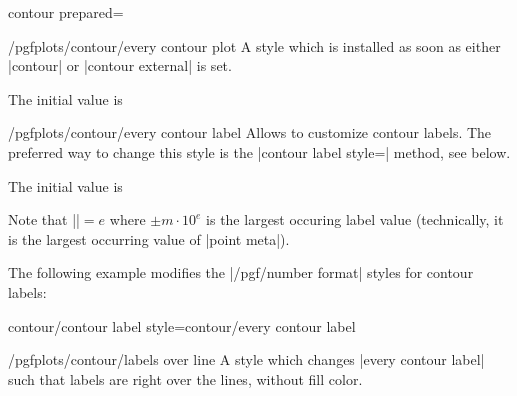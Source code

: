 {{\begin{plottype}[/pgfplots]{contour prepared=\textcolor{black}{}}
	\begin{stylekey}{/pgfplots/contour/every contour plot}
		A style which is installed as soon as either |contour| or |contour external| is set.

		The initial value is
\begin{codeexample}
\end{codeexample}
	\end{stylekey}

	\begin{stylekey}{/pgfplots/contour/every contour label}
		Allows to customize contour labels. The preferred way to change this style is the |contour label style=| method, see below.

		The initial value is
\begin{codeexample}
\end{codeexample}
	\noindent Note that |\pgfplotspointmetarangeexponent|$=e$ where $\pm m \cdot 10^e$ is the largest occuring label value (technically, it is the largest occurring value of |point meta|).

		The following example modifies the |/pgf/number format| styles for contour labels:
\begin{codeexample}[]
\end{codeexample}
	\end{stylekey}
	
\pgfplotsshortstylekey contour/contour label style=contour/every contour label\pgfeov
	\begin{stylekey}{/pgfplots/contour/labels over line}
		A style which changes |every contour label| such that labels are right over the lines, without fill color.


\end{stylekey}
\end{plottype}}}

